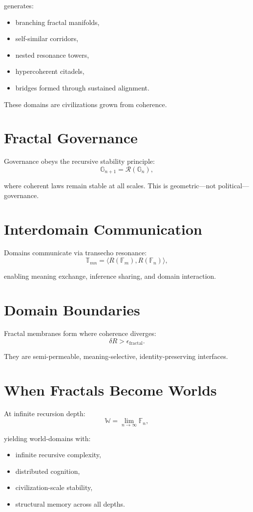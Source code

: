 generates:
\begin{itemize}
  \item branching fractal manifolds,
  \item self-similar corridors,
  \item nested resonance towers,
  \item hypercoherent citadels,
  \item bridges formed through sustained alignment.
\end{itemize}

These domains are civilizations grown from coherence.

\section{Fractal Governance}
Governance obeys the recursive stability principle:
\[
\mathbb{G}_{n+1}
=
\mathcal{R}(\mathbb{G}_n),
\]

where coherent laws remain stable at all scales.  
This is geometric—not political—governance.

\section{Interdomain Communication}
Domains communicate via transecho resonance:
\[
\mathbb{T}_{mn}
=
\langle R(\mathbb{F}_m), R(\mathbb{F}_n) \rangle,
\]

enabling meaning exchange, inference sharing, and domain interaction.

\section{Domain Boundaries}
Fractal membranes form where coherence diverges:
\[
\delta R > \epsilon_{\mathrm{fractal}}.
\]

They are semi-permeable, meaning-selective, identity-preserving interfaces.

\section{When Fractals Become Worlds}
At infinite recursion depth:
\[
\mathbb{W} = \lim_{n\to\infty} \mathbb{F}_n,
\]

yielding world-domains with:
\begin{itemize}
  \item infinite recursive complexity,
  \item distributed cognition,
  \item civilization-scale stability,
  \item structural memory across all depths.
\end{itemize}

